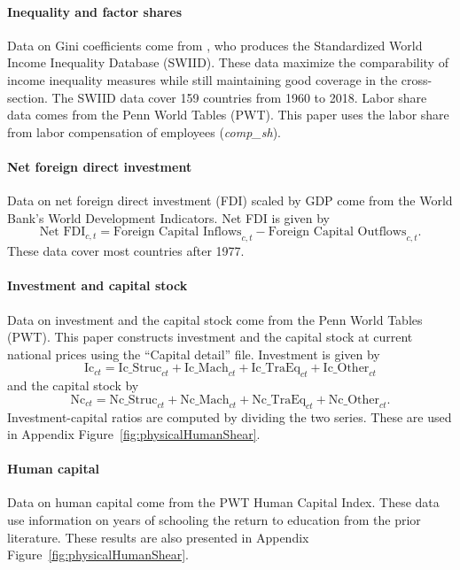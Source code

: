 \documentclass[12pt]{article}
\numberwithin{equation}{section}
\begin{document}
\paragraph{Inequality and factor shares}
Data on Gini coefficients come from \cite{Solt2020}, who produces the Standardized World Income Inequality Database (SWIID). These data maximize the comparability of income inequality measures while still maintaining good coverage in the cross-section. The SWIID data cover 159 countries from 1960 to 2018. Labor share data comes from the Penn World Tables (PWT). This paper uses the labor share from labor compensation of employees (\textit{comp\_sh}).

\paragraph{Net foreign direct investment }
Data on net foreign direct investment (FDI) scaled by GDP come from the World Bank's World Development Indicators. Net FDI is given by
\begin{equation}
\text{Net FDI}_{c,t} = \text{Foreign Capital Inflows}_{c,t} - \text{Foreign Capital Outflows}_{c,t}.
\end{equation}
These data cover most countries after 1977.

\paragraph{Investment and capital stock}
Data on investment and the capital stock come from the Penn World Tables (PWT). This paper constructs investment and the capital stock at current national prices using the ``Capital detail'' file.  Investment is given by
\begin{equation}
\text{Ic}_{ct} = \text{Ic\_Struc}_{ct} + \text{Ic\_Mach}_{ct} + \text{Ic\_TraEq}_{ct} + \text{Ic\_Other}_{ct}
\end{equation}
and the capital stock by
\begin{equation}
\text{Nc}_{ct} = \text{Nc\_Struc}_{ct} + \text{Nc\_Mach}_{ct} + \text{Nc\_TraEq}_{ct} + \text{Nc\_Other}_{ct}.
\end{equation}
Investment-capital ratios are computed by dividing the two series. These are used in Appendix Figure~\ref{fig:physicalHumanShear}.

\paragraph{Human capital}
Data on human capital come from the PWT Human Capital Index. These data use information on years of schooling the return to education from the prior literature. These results are also presented in Appendix Figure~\ref{fig:physicalHumanShear}.
\end{document}
